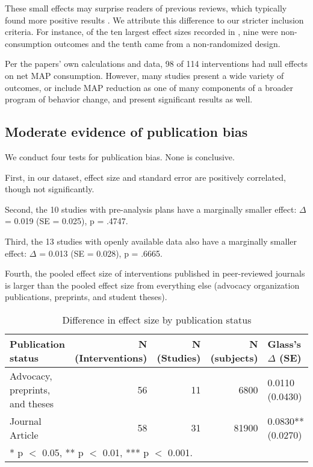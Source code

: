 \documentclass[sn-nature,referee,pdflatex]{sn-jnl}
\begin{document}
These small effects may surprise readers of previous reviews, which
typically found more positive results
\citep{mathur2021meta, meier2022, mertens2022}. We attribute this
difference to our stricter inclusion criteria. For instance, of the ten
largest effect sizes recorded in \citep{mathur2021effectiveness}, nine
were non-consumption outcomes and the tenth came from a non-randomized
design.

Per the papers' own calculations and data, 98 of 114 interventions had
null effects on net MAP consumption. However, many studies present a
wide variety of outcomes, or include MAP reduction as one of many
components of a broader program of behavior change, and present
significant results as well.

\begin{comment}
Could put this back in: "Using our calculations of effect size and standard error 15 interventions have 95%
\end{comment}

\subsection{Moderate evidence of publication bias}\label{sec2.2}

We conduct four tests for publication bias. None is conclusive.

\begin{comment} 
Could put in introductory remarks about how this puts our main results in one light or another? 
\end{comment}

First, in our dataset, effect size and standard error are positively
correlated, though not significantly.

Second, the 10 studies with pre-analysis plans have a marginally smaller
effect: \(\Delta\) = 0.019 (SE = 0.025), p = .4747.

Third, the 13 studies with openly available data also have a marginally
smaller effect: \(\Delta\) = 0.013 (SE = 0.028), p = .6665.

Fourth, the pooled effect size of interventions published in
peer-reviewed journals is larger than the pooled effect size from
everything else (advocacy organization publications, preprints, and
student theses).

\begin{table}[!h]
\centering
\caption{\label{tab:table_three}Difference in effect size by publication status}
\centering
\begin{tabular}[t]{lrrrl}
\toprule
Publication status & N (Interventions) & N (Studies) & N (subjects) & Glass's $\Delta$ (SE)\\
\midrule
Advocacy, preprints, and theses & 56 & 11 & 6800 & 0.0110 (0.0430)\\
Journal Article & 58 & 31 & 81900 & 0.0830** (0.0270)\\
\bottomrule
\multicolumn{5}{l}{\rule{0pt}{1em}* p $<$ 0.05, ** p $<$ 0.01, *** p $<$ 0.001.}\\
\end{tabular}
\end{table}
\end{document}
